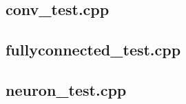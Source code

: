 \subsection{conv\_test.cpp}

\pagebreak


\subsection{fullyconnected\_test.cpp}

\pagebreak


\subsection{neuron\_test.cpp}

\pagebreak
